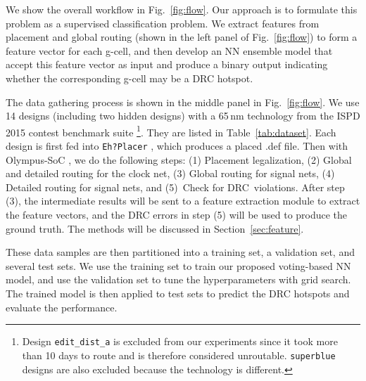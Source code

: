 \documentclass[10pt, final, letter, twocolumns]{IEEEtran}
\begin{document}
We show the overall workflow in
Fig.~\ref{fig:flow}. Our approach is to formulate this problem as a supervised classification problem. We extract features from placement and global routing   (shown in the left panel of Fig.~\ref{fig:flow}) to form a feature vector for each g-cell, and then develop an NN ensemble model that accept this feature vector as input and produce a binary output indicating whether the corresponding g-cell may be a DRC hotspot. %

The data gathering process is shown in the middle panel in Fig.~\ref{fig:flow}. We use 14 designs (including two hidden designs) with a 65\,nm technology from the ISPD 2015 contest benchmark suite \cite{ISPD15benchmark}\footnote{Design \texttt{edit\_dist\_a} is excluded from our experiments since it took more than 10 days to route and is therefore considered unroutable. \texttt{superblue} designs are also excluded because the technology is different.}.  They are listed in Table~\ref{tab:dataset}. Each design is first fed into \texttt{Eh?Placer} \cite{ehplacer}, which produces a placed .def file. Then with Olympus-SoC \cite{olympus}, we do the following steps:
(1) Placement legalization, (2) Global and detailed routing for the clock net, (3) Global routing for signal nets,  (4) Detailed routing for signal nets, and (5)\ Check for DRC\ violations. 
 After step (3), the intermediate results will be sent to a feature extraction module to extract the feature vectors, and the DRC errors in step (5) will be used to produce the ground truth. The methods will be discussed in Section~\ref{sec:feature}.


These data samples are then partitioned into a training set, a validation set, and several test sets. We use the training set to train our proposed voting-based NN model, and use the validation set to tune the hyperparameters with grid search. The trained model is then applied to test sets to predict the DRC hotspots and evaluate the performance. %

\end{document}
